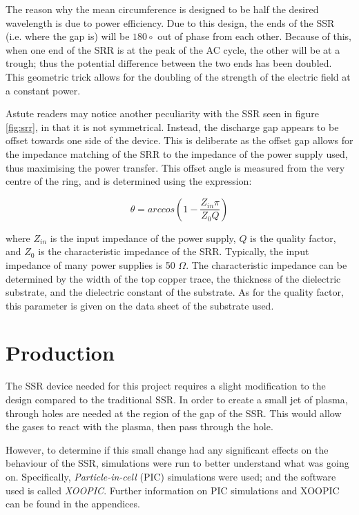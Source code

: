 The reason why the mean circumference is designed to be half the desired wavelength is due to power efficiency. Due to this design, the ends of the SSR (i.e. where the gap is) will be $180 \circ$ out of phase from each other. Because of this, when one end of the SRR is at the peak of the AC cycle, the other will be at a trough; thus the potential difference between the two ends has been doubled. This geometric trick allows for the doubling of the strength of the electric field at a constant power. 

Astute readers may notice another peculiarity with the SSR seen in figure \ref{fig:srr}, in that it is not symmetrical. Instead, the discharge gap appears to be offset towards one side of the device. This is deliberate as the offset gap allows for the impedance matching of the SRR to the impedance of the power supply used, thus maximising the power transfer. This offset angle is measured from the very centre of the ring, and is determined using the expression:

\begin{equation}
	\theta = arccos(1 - \frac{Z_{in} \pi}{Z_0 Q})
	\label{eq:offset_angle}
\end{equation}


where $Z_{in}$ is the input impedance of the power supply, $Q$ is the quality factor, and $Z_0$ is the characteristic impedance of the SRR. Typically, the input impedance of many power supplies is 50 $\Omega$. The characteristic impedance can be determined by the width of the top copper trace, the thickness of the dielectric substrate, and the dielectric constant of the substrate. As for the quality factor, this parameter is given on the data sheet of the substrate used.

\section{Production}

The SSR device needed for this project requires a slight modification to the design compared to the traditional SSR. In order to create a small jet of plasma, through holes are needed at the region of the gap of the SSR. This would allow the gases to react with the plasma, then pass through the hole.

However, to determine if this small change had any significant effects on the behaviour of the SSR, simulations were run to better understand what was going on. Specifically, \textit{Particle-in-cell} (PIC) simulations were used; and the software used is called \textit{XOOPIC}. Further information on PIC simulations and XOOPIC can be found in the appendices. 

